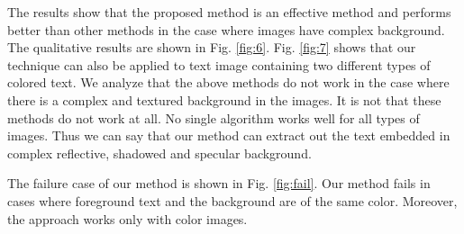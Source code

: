 The results show that the proposed method is an effective method and performs better than other methods 
in the case where images have
complex background. The qualitative results are shown in Fig. \ref{fig:6}. Fig. \ref{fig:7} shows that our technique can also be applied to text image containing 
two different types of colored text.
We analyze that the above methods do not work in the case where there is a complex and textured background in the images.
It is not that these methods do not work at all. No single algorithm works well for all types of images. Thus we can say
that our method can extract out the text embedded in complex reflective, shadowed and
specular background.


The failure case of our method is shown in Fig. \ref{fig:fail}.
Our method fails in cases where foreground text and the background are of the same color.
Moreover, the approach works only with color images.



% 
% 
% 

